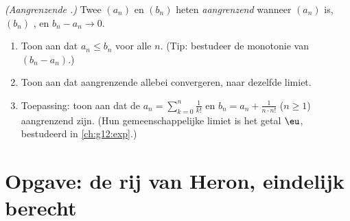 \begin{exercise}[$\star\star\star$]\label{exo:g12:seq:10}
\emph{(Aangrenzende .)} Twee  $(a_n)$ en $(b_n)$ heten
\emph{aangrenzend} wanneer $(a_n)$  is, $(b_n)$ , en
$b_n - a_n \to 0$.
\begin{enumerate}
  \item Toon aan dat $a_n \leq b_n$ voor alle $n$. (Tip: bestudeer de
        monotonie van $(b_n - a_n)$.)
  \item Toon aan dat aangrenzende  allebei convergeren, naar dezelfde
        limiet.
  \item Toepassing: toon aan dat de  $a_n = \sum_{k=0}^{n} \frac{1}{k!}$
        en $b_n = a_n + \frac{1}{n \cdot n!}$ ($n \geq 1$) aangrenzend zijn.
        (Hun gemeenschappelijke limiet is het getal $\eu$, bestudeerd in
        \cref{ch:g12:exp}.)
\end{enumerate}
\end{exercise}

\section{Opgave: de rij van Heron, eindelijk berecht}

